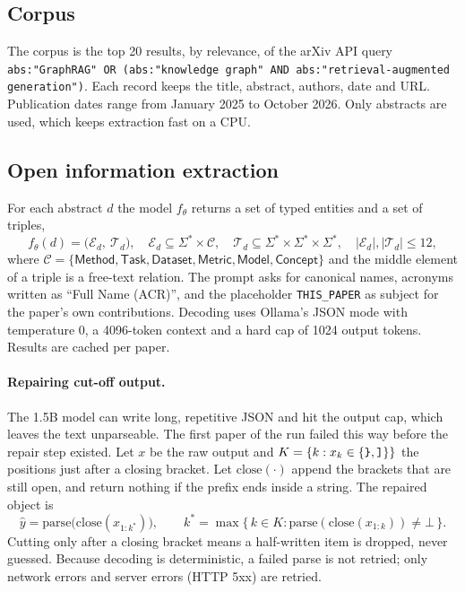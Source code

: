 \documentclass[11pt]{article}
\newcommand{\code}[1]{\texttt{#1}}
\begin{document}
\subsection{Corpus}
The corpus is the top 20 results, by relevance, of the arXiv API query \code{abs:"GraphRAG" OR (abs:"knowledge graph" AND abs:"retrieval-augmented generation")}. Each record keeps the title, abstract, authors, date and URL. Publication dates range from January 2025 to October 2026. Only abstracts are used, which keeps extraction fast on a CPU.

\subsection{Open information extraction}\label{sec:extract}
For each abstract $d$ the model $f_\theta$ returns a set of typed entities and a set of triples,
\begin{equation}
  f_\theta(d) = \big(\mathcal{E}_d,\ \mathcal{T}_d\big),\quad
  \mathcal{E}_d \subseteq \Sigma^* \times \mathcal{C},\quad
  \mathcal{T}_d \subseteq \Sigma^* \times \Sigma^* \times \Sigma^*,\quad
  |\mathcal{E}_d|,|\mathcal{T}_d| \le 12,
\end{equation}
where $\mathcal{C}=\{\textsf{Method},\textsf{Task},\textsf{Dataset},\textsf{Metric},\textsf{Model},\textsf{Concept}\}$ and the middle element of a triple is a free-text relation. The prompt asks for canonical names, acronyms written as ``Full Name (ACR)'', and the placeholder \code{THIS\_PAPER} as subject for the paper's own contributions. Decoding uses Ollama's JSON mode with temperature 0, a 4096-token context and a hard cap of 1024 output tokens. Results are cached per paper.

\paragraph{Repairing cut-off output.} The 1.5B model can write long, repetitive JSON and hit the output cap, which leaves the text unparseable. The first paper of the run failed this way before the repair step existed. Let $x$ be the raw output and $K=\{k : x_k \in \{\texttt{\char`\}},\code{]}\}\}$ the positions just after a closing bracket. Let $\mathrm{close}(\cdot)$ append the brackets that are still open, and return nothing if the prefix ends inside a string. The repaired object is
\begin{equation}
  \hat{y} = \mathrm{parse}\big(\mathrm{close}(x_{1:k^*})\big),\qquad
  k^* = \max\{\,k \in K : \mathrm{parse}(\mathrm{close}(x_{1:k})) \neq \bot\,\}.
\end{equation}
Cutting only after a closing bracket means a half-written item is dropped, never guessed. Because decoding is deterministic, a failed parse is not retried; only network errors and server errors (HTTP 5xx) are retried.
\end{document}
